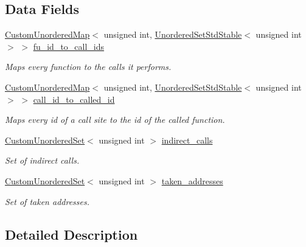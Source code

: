 \subsection*{Data Fields}
\begin{DoxyCompactItemize}
\item 
\hyperlink{custom__map_8hpp_ad1ed68f2ff093683ab1a33522b144adc}{Custom\+Unordered\+Map}$<$ unsigned int, \hyperlink{custom__set_8hpp_a1f63d303cef2790dc0a0ff7feae38f83}{Unordered\+Set\+Std\+Stable}$<$ unsigned int $>$ $>$ \hyperlink{structCallSitesInfo_a7496639281820e49c60d12578adc79eb}{fu\+\_\+id\+\_\+to\+\_\+call\+\_\+ids}
\begin{DoxyCompactList}\small\item\em Maps every function to the calls it performs. \end{DoxyCompactList}\item 
\hyperlink{custom__map_8hpp_ad1ed68f2ff093683ab1a33522b144adc}{Custom\+Unordered\+Map}$<$ unsigned int, \hyperlink{custom__set_8hpp_a1f63d303cef2790dc0a0ff7feae38f83}{Unordered\+Set\+Std\+Stable}$<$ unsigned int $>$ $>$ \hyperlink{structCallSitesInfo_ad530622005380528de3c3672d3ada8ec}{call\+\_\+id\+\_\+to\+\_\+called\+\_\+id}
\begin{DoxyCompactList}\small\item\em Maps every id of a call site to the id of the called function. \end{DoxyCompactList}\item 
\hyperlink{classCustomUnorderedSet}{Custom\+Unordered\+Set}$<$ unsigned int $>$ \hyperlink{structCallSitesInfo_a53979c010bc7bff2e8a8dbc4b435cb35}{indirect\+\_\+calls}
\begin{DoxyCompactList}\small\item\em Set of indirect calls. \end{DoxyCompactList}\item 
\hyperlink{classCustomUnorderedSet}{Custom\+Unordered\+Set}$<$ unsigned int $>$ \hyperlink{structCallSitesInfo_a870863c2fdca0fc5044ba9020fdbbd9a}{taken\+\_\+addresses}
\begin{DoxyCompactList}\small\item\em Set of taken addresses. \end{DoxyCompactList}\end{DoxyCompactItemize}


\subsection{Detailed Description}


